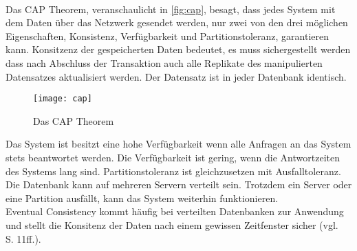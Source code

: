 \\
Das \gls{CAP} Theorem, veranschaulicht in \autoref{fig:cap}, besagt, dass jedes System mit dem Daten über das Netzwerk gesendet werden, nur zwei von den drei möglichen Eigenschaften, Konsistenz, Verfügbarkeit und Partitionstoleranz, garantieren kann.
Konsitzenz der gespeicherten Daten bedeutet, es muss sichergestellt werden dass nach Abschluss der Transaktion auch alle Replikate des manipulierten Datensatzes aktualisiert werden. Der Datensatz ist in jeder Datenbank identisch.
%
\begin{figure}[H]
  \centering
  \texttt{[image: cap]}
  \grayRule
  \caption{Das CAP Theorem}
  \label{fig:cap}
\end{figure}
%
Das System ist besitzt eine hohe Verfügbarkeit wenn alle Anfragen an das System stets beantwortet werden. Die Verfügbarkeit ist gering, wenn die Antwortzeiten des Systems lang sind.
Partitionstoleranz ist gleichzusetzen mit Ausfalltoleranz. Die Datenbank kann auf mehreren Servern verteilt sein. Trotzdem ein Server oder eine Partition ausfällt, kann das System weiterhin funktionieren.\\
Eventual Consistency kommt häufig bei verteilten Datenbanken zur Anwendung und stellt die Konsitenz der Daten nach einem gewissen Zeitfenster sicher (vgl. ~\cite{couchDB} S. 11ff.). 

